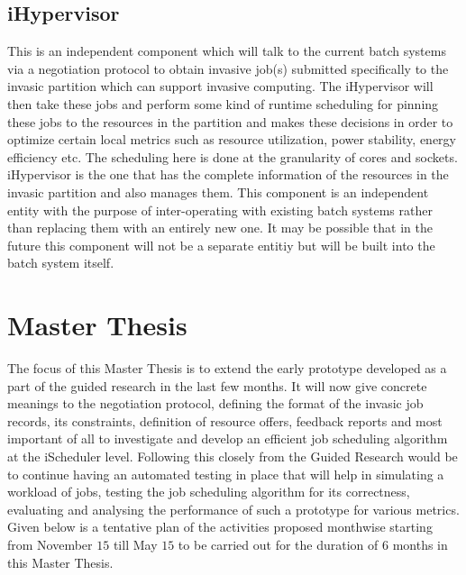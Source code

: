\documentclass{article}
\begin{document}
\subsection{iHypervisor}
This is an independent component which will talk to the current batch systems via a negotiation protocol to obtain invasive job(s) submitted specifically to the invasic partition which can support invasive computing. The iHypervisor will then take these jobs and perform some kind of runtime scheduling for pinning these jobs to the resources in the partition and makes these decisions in order to optimize certain local metrics such as resource utilization, power stability, energy efficiency etc. The scheduling here is done at the granularity of cores and sockets. iHypervisor is the one that has the complete information of the resources in the invasic partition and also manages them. This component is an independent entity with the purpose of inter-operating with existing batch systems rather than replacing them with an entirely new one. It may be possible that in the future this component will not be a separate entitiy but will be built into the batch system itself.\par
\section{Master Thesis}
The focus of this Master Thesis is to extend the early prototype developed as a part of the guided research in the last few months. It will now give concrete meanings to the negotiation protocol, defining the format of the invasic job records, its constraints, definition of resource offers, feedback reports and most important of all to investigate and develop an efficient job scheduling algorithm at the iScheduler level. Following this closely from the Guided Research would be to continue having an automated testing in place that will help in simulating a workload of jobs, testing the job scheduling algorithm for its correctness, evaluating and analysing the performance of such a prototype for various metrics. Given below is a tentative plan of the activities proposed monthwise starting from November $15$ till May $15$ to be carried out for the duration of 6 months in this Master Thesis.\par
\end{document}
